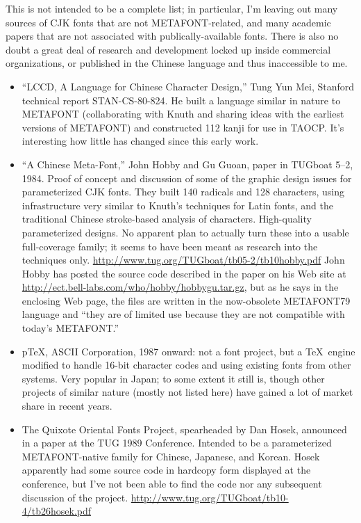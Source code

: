 \documentclass[14pt]{extarticle}
\begin{document}
This is not intended to be a complete list; in particular, I'm leaving out
many sources of CJK fonts that are not METAFONT-related, and many academic
papers that are not associated with publically-available fonts.  There is
also no doubt a great deal of research and development locked up inside
commercial organizations, or published in the Chinese language and thus
inaccessible to me.

\begin{itemize}

\item ``LCCD, A Language for Chinese Character Design,'' Tung Yun Mei,
Stanford technical report STAN-CS-80-824.  He built a language similar in
nature to METAFONT (collaborating with Knuth and sharing ideas with the
earliest versions of METAFONT) and constructed 112 kanji for use in TAOCP. 
It's interesting how little has changed since this early work.

\item ``A Chinese Meta-Font,'' John Hobby and Gu Guoan, paper in TUGboat
5--2, 1984.  Proof of concept and discussion of some of the graphic design
issues for parameterized CJK fonts.  They built 140 radicals and 128
characters, using infrastructure very similar to Knuth's techniques for
Latin fonts, and the traditional Chinese stroke-based analysis of
characters.  High-quality parameterized designs.  No apparent plan to
actually turn these into a usable full-coverage family; it seems to have
been meant as research into the techniques only. 
\url{http://www.tug.org/TUGboat/tb05-2/tb10hobby.pdf}  John Hobby has posted
the source code described in the paper on his Web site at
\url{http://ect.bell-labs.com/who/hobby/hobbygu.tar.gz}, but as he says in
the enclosing Web page, the files are written in the now-obsolete
METAFONT79 language and ``they are of limited use because they are not
compatible with today's METAFONT.''

\item p\TeX, ASCII Corporation, 1987 onward: not a font project, but a \TeX\
engine modified to handle 16-bit character codes and using existing fonts
from other systems.  Very popular in Japan; to some extent it still is,
though other projects of similar nature (mostly not listed here) have
gained a lot of market share in recent years.

\item The Quixote Oriental Fonts Project, spearheaded by Dan Hosek,
announced in a paper at the TUG 1989 Conference.  Intended to be a
parameterized METAFONT-native family for Chinese, Japanese, and Korean.
Hosek apparently had some source code in hardcopy form displayed at the
conference, but I've not been able to find the code nor any subsequent
discussion of the project.
\url{http://www.tug.org/TUGboat/tb10-4/tb26hosek.pdf}


\end{itemize}
\end{document}
